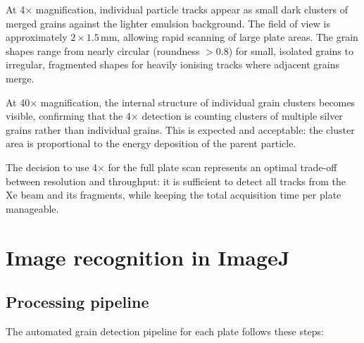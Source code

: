 \documentclass[12pt,a4paper]{article}
\begin{document}
At 4$\times$ magnification, individual particle tracks appear as small
dark clusters of merged grains against the lighter emulsion background.
The field of view is approximately $2\times1.5$\,mm, allowing rapid
scanning of large plate areas. The grain shapes range from nearly
circular (roundness $>0.8$) for small, isolated grains to irregular,
fragmented shapes for heavily ionising tracks where adjacent grains
merge.

At 40$\times$ magnification, the internal structure of individual grain
clusters becomes visible, confirming that the 4$\times$ detection is
counting clusters of multiple silver grains rather than individual
grains. This is expected and acceptable: the cluster area is
proportional to the energy deposition of the parent particle.

The decision to use 4$\times$ for the full plate scan represents an
optimal trade-off between resolution and throughput: it is sufficient to
detect all tracks from the Xe beam and its fragments, while keeping the
total acquisition time per plate manageable.

\section{Image recognition in ImageJ}
\label{sec:recognition}

\subsection{Processing pipeline}

The automated grain detection pipeline for each plate follows these
steps:
\end{document}
